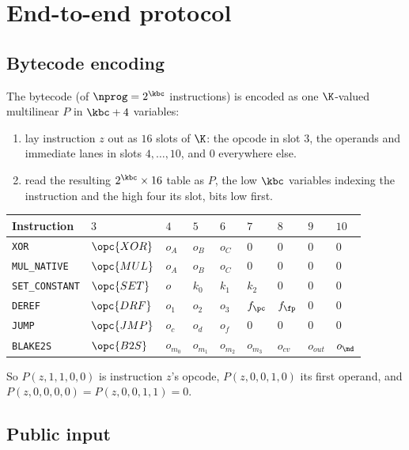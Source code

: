 \section{End-to-end protocol}\label{sec:e2e}

\subsection{Bytecode encoding}\label{sec:e2e-bc}

The bytecode (of $\nprog=2^{\kbc}$ instructions) is encoded as one $\K$-valued multilinear $P$ in $\kbc+4$ variables:
\begin{enumerate}[itemsep=1pt,topsep=3pt]
\item lay instruction $z$ out as $16$ slots of $\K$: the opcode in slot $3$, the operands and immediate lanes in slots $4,\dots,10$, and $0$ everywhere else.
\item read the resulting $2^{\kbc}\times16$ table as $P$, the low $\kbc$ variables indexing the instruction and the high four its slot, bits low first.
\end{enumerate}
\begin{center}
\begin{tabular}{lllllllll}
\hline
Instruction & $3$ & $4$ & $5$ & $6$ & $7$ & $8$ & $9$ & $10$\\
\hline
\texttt{XOR}           & $\opc{XOR}$ & $o_A$ & $o_B$ & $o_C$ & $0$ & $0$ & $0$ & $0$\\
\texttt{MUL\_NATIVE}   & $\opc{MUL}$ & $o_A$ & $o_B$ & $o_C$ & $0$ & $0$ & $0$ & $0$\\
\texttt{SET\_CONSTANT} & $\opc{SET}$ & $o$   & $k_0$ & $k_1$ & $k_2$ & $0$ & $0$ & $0$\\
\texttt{DEREF}         & $\opc{DRF}$ & $o_1$ & $o_2$ & $o_3$ & $f_{\pc}$ & $f_{\fp}$ & $0$ & $0$\\
\texttt{JUMP}          & $\opc{JMP}$ & $o_c$ & $o_d$ & $o_f$ & $0$ & $0$ & $0$ & $0$\\
\texttt{BLAKE2S}        & $\opc{B2S}$  & $o_{m_0}$ & $o_{m_1}$ & $o_{m_2}$ & $o_{m_3}$ & $o_{\mathit{cv}}$ & $o_{\mathit{out}}$ & $o_{\md}$\\
\hline
\end{tabular}
\end{center}
So $P(z,1,1,0,0)$ is instruction $z$'s opcode, $P(z,0,0,1,0)$ its first operand, and $P(z,0,0,0,0)=P(z,0,0,1,1)=0$.

\subsection{Public input}\label{sec:e2e-pi}

